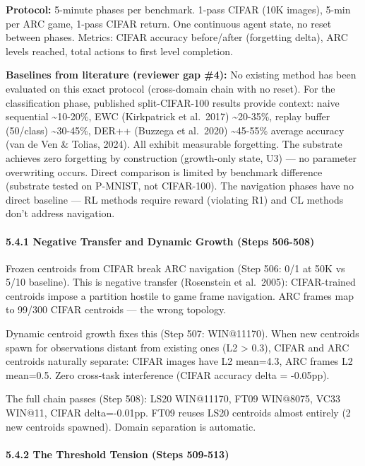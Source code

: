 \documentclass[
  11pt,
]{article}
\begin{document}
\textbf{Protocol:} 5-minute phases per benchmark. 1-pass CIFAR (10K
images), 5-min per ARC game, 1-pass CIFAR return. One continuous agent
state, no reset between phases. Metrics: CIFAR accuracy before/after
(forgetting delta), ARC levels reached, total actions to first level
completion.

\textbf{Baselines from literature (reviewer gap \#4):} No existing
method has been evaluated on this exact protocol (cross-domain chain
with no reset). For the classification phase, published split-CIFAR-100
results provide context: naive sequential \textasciitilde10-20\%, EWC
(Kirkpatrick et al.~2017) \textasciitilde20-35\%, replay buffer
(50/class) \textasciitilde30-45\%, DER++ (Buzzega et al.~2020)
\textasciitilde45-55\% average accuracy (van de Ven \& Tolias, 2024).
All exhibit measurable forgetting. The substrate achieves zero
forgetting by construction (growth-only state, U3) --- no parameter
overwriting occurs. Direct comparison is limited by benchmark difference
(substrate tested on P-MNIST, not CIFAR-100). The navigation phases have
no direct baseline --- RL methods require reward (violating R1) and CL
methods don't address navigation.

\paragraph{5.4.1 Negative Transfer and Dynamic Growth (Steps
506-508)}\label{negative-transfer-and-dynamic-growth-steps-506-508}

Frozen centroids from CIFAR break ARC navigation (Step 506: 0/1 at 50K
vs 5/10 baseline). This is negative transfer (Rosenstein et al.~2005):
CIFAR-trained centroids impose a partition hostile to game frame
navigation. ARC frames map to 99/300 CIFAR centroids --- the wrong
topology.

Dynamic centroid growth fixes this (Step 507: WIN@11170). When new
centroids spawn for observations distant from existing ones (L2
\textgreater{} 0.3), CIFAR and ARC centroids naturally separate: CIFAR
images have L2 mean=4.3, ARC frames L2 mean=0.5. Zero cross-task
interference (CIFAR accuracy delta = -0.05pp).

The full chain passes (Step 508): LS20 WIN@11170, FT09 WIN@8075, VC33
WIN@11, CIFAR delta=-0.01pp. FT09 reuses LS20 centroids almost entirely
(2 new centroids spawned). Domain separation is automatic.

\paragraph{5.4.2 The Threshold Tension (Steps
509-513)}\label{the-threshold-tension-steps-509-513}
\end{document}
